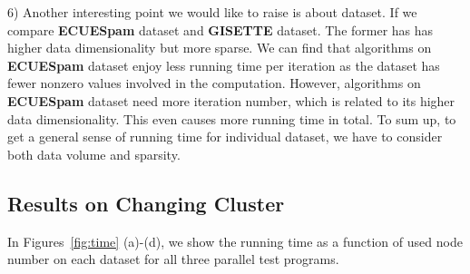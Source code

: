 \documentclass[10pt, conference, compsocconf]{IEEEtran}
\begin{document}
6) Another interesting point we would like to raise is about dataset. If we compare \textbf{ECUESpam} dataset and \textbf{GISETTE} dataset.
          The former has has higher data dimensionality but more sparse.
          We can find that algorithms on \textbf{ECUESpam} dataset enjoy less running time per iteration as the dataset has fewer nonzero values involved in the computation.
          However, algorithms on \textbf{ECUESpam} dataset need more iteration number, which is related to its higher data dimensionality. This even causes more running time in total.
          To sum up, to get a general sense of running time for individual dataset, we have to consider both data volume and sparsity.

\subsection{Results on Changing Cluster}
In Figures~\ref{fig:time} (a)-(d), we show the running time as a function of used node number on each dataset for all three parallel test programs.
%
\end{document}
